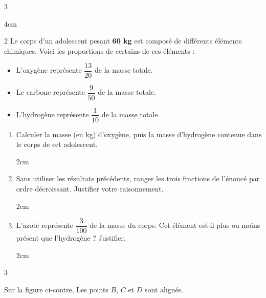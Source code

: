 \documentclass[a4paper]{book}
\begin{document}
{\begin{exerciceNote}{3}
\begin{minipage}{0.32\linewidth}
            \begin{ZoneReponse}{4cm}
            \end{ZoneReponse}
        \end{minipage}
    \end{exerciceNote}


    \begin{exerciceNote}{2}
        Le corps d'un adolescent pesant \textbf{60 kg} est composé de différents éléments chimiques. Voici les proportions de certains de ces éléments :
        \begin{itemize}
            \item L'oxygène représente $\dfrac{13}{20}$ de la masse totale.
            \item Le carbone représente $\dfrac{9}{50}$ de la masse totale.
            \item L'hydrogène représente $\dfrac{1}{10}$ de la masse totale.
        \end{itemize}
        
        \begin{enumerate}
            \item Calculer la masse (en kg) d'oxygène, puis la masse d'hydrogène contenue dans le corps de cet adolescent.
            \begin{ZoneReponse}{2cm}
            \end{ZoneReponse}
            
            \item Sans utiliser les résultats précédents, ranger les trois fractions de l'énoncé par ordre décroissant. Justifier votre raisonnement.
            \begin{ZoneReponse}{2cm}
            \end{ZoneReponse}
            
            \item L'azote représente $\dfrac{3}{100}$ de la masse du corps. Cet élément est-il plus ou moins présent que l'hydrogène ? Justifier.
            \begin{ZoneReponse}{2cm}
            \end{ZoneReponse}
        \end{enumerate}
    \end{exerciceNote}


    \begin{exerciceNote}{3}
        \begin{minipage}{0.65\linewidth}
            Sur la figure ci-contre, Les points $B$, $C$ et $D$ sont alignés.
            

\end{minipage}
\end{exerciceNote}}
\end{document}
